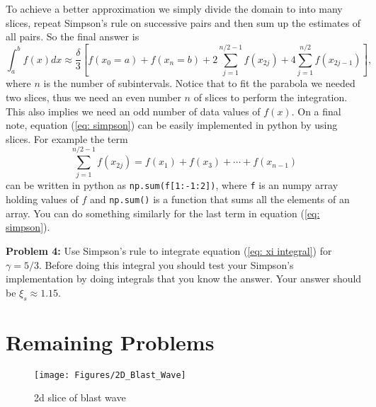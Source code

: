 \documentclass{article}
\begin{document}
To achieve a better approximation we simply divide the domain to into many slices, repeat Simpson's rule on successive pairs and then sum up the estimates of all pairs. So the final answer is
\begin{equation}
\label{eq: simpson}
\int_a^b f(x) dx \approx \frac{\delta}{3}\left[f(x_0=a) + f(x_n=b) + 2\sum_{j=1}^{n/2-1} f(x_{2j}) + 4\sum_{j=1}^{n/2}f(x_{2j-1})\right],
\end{equation}
where $n$ is the number of subintervals. Notice that to fit the parabola we needed two slices, thus we need an even number $n$ of slices to perform the integration. This also implies we need an odd number of data values of $f(x)$. On a final note, equation (\ref{eq: simpson}) can be easily implemented in python by using slices. For example the term
\begin{equation}
\sum_{j=1}^{n/2-1} f(x_{2j})=f(x_1) + f(x_3) + \cdots + f(x_{n-1})
\end{equation}
can be written in python as {\tt np.sum(f[1:-1:2])}, where {\tt f} is an numpy array holding values of $f$ and {\tt np.sum()} is a function that sums all the elements of an array. You can do something similarly for the last term in equation (\ref{eq: simpson}).

\bigskip
\noindent
\textbf{Problem 4:} Use Simpson's rule to integrate equation (\ref{eq: xi integral}) for $\gamma=5/3$. Before doing this integral you should test your Simpson's implementation by doing integrals that you know the answer. Your answer should be $\xi_s \approx 1.15$.


\section{Remaining Problems}
\begin{figure}[h!]
\begin{center}
\texttt{[image: Figures/2D\_Blast\_Wave]}
\end{center}
\caption{2d slice of blast wave}
\label{fig: slice blast wave solution}
\end{figure}
\end{document}
